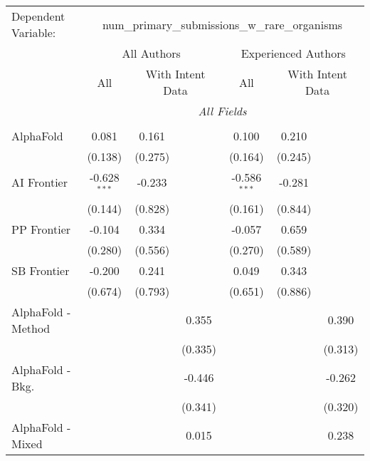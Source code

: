 \begingroup
\centering
\begin{tabular}{lcccccc}
   \tabularnewline \midrule \midrule
   Dependent Variable: & \multicolumn{6}{c}{num\_primary\_submissions\_w\_rare\_organisms}\\
 & \multicolumn{3}{c}{All Authors} & \multicolumn{3}{c}{Experienced Authors} \\
\cmidrule(lr){2-4} \cmidrule(lr){5-7}
 & \multicolumn{1}{c}{All} & \multicolumn{2}{c}{With Intent Data} & \multicolumn{1}{c}{All} & \multicolumn{2}{c}{With Intent Data} \\
\cmidrule(lr){2-2} \cmidrule(lr){3-4} \cmidrule(lr){5-5} \cmidrule(lr){6-7}
 & \multicolumn{6}{c}{\textit{All Fields}} \\ \\
   AlphaFold            & 0.081          & 0.161   &               & 0.100          & 0.210   &   \\   
                        & (0.138)        & (0.275) &               & (0.164)        & (0.245) &   \\   
   AI Frontier          & -0.628$^{***}$ & -0.233  &               & -0.586$^{***}$ & -0.281  &   \\   
                        & (0.144)        & (0.828) &               & (0.161)        & (0.844) &   \\   
   PP Frontier          & -0.104         & 0.334   &               & -0.057         & 0.659   &   \\   
                        & (0.280)        & (0.556) &               & (0.270)        & (0.589) &   \\   
   SB Frontier          & -0.200         & 0.241   &               & 0.049          & 0.343   &   \\   
                        & (0.674)        & (0.793) &               & (0.651)        & (0.886) &   \\   
   AlphaFold - Method   &                &         & 0.355         &                &         & 0.390\\   
                        &                &         & (0.335)       &                &         & (0.313)\\   
   AlphaFold - Bkg.     &                &         & -0.446        &                &         & -0.262\\   
                        &                &         & (0.341)       &                &         & (0.320)\\   
   AlphaFold - Mixed    &                &         & 0.015         &                &         & 0.238\\   

\end{tabular}
